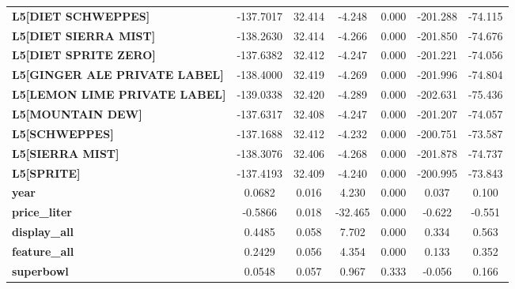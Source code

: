 \begin{center}
\begin{tabular}{lcccccc}
\textbf{L5[DIET SCHWEPPES]}                &    -137.7017  &       32.414     &    -4.248  &         0.000        &     -201.288    &      -74.115     \\
\textbf{L5[DIET SIERRA MIST]}              &    -138.2630  &       32.414     &    -4.266  &         0.000        &     -201.850    &      -74.676     \\
\textbf{L5[DIET SPRITE ZERO]}              &    -137.6382  &       32.412     &    -4.247  &         0.000        &     -201.221    &      -74.056     \\
\textbf{L5[GINGER ALE PRIVATE LABEL]}      &    -138.4000  &       32.419     &    -4.269  &         0.000        &     -201.996    &      -74.804     \\
\textbf{L5[LEMON LIME PRIVATE LABEL]}      &    -139.0338  &       32.420     &    -4.289  &         0.000        &     -202.631    &      -75.436     \\
\textbf{L5[MOUNTAIN DEW]}                  &    -137.6317  &       32.408     &    -4.247  &         0.000        &     -201.207    &      -74.057     \\
\textbf{L5[SCHWEPPES]}                     &    -137.1688  &       32.412     &    -4.232  &         0.000        &     -200.751    &      -73.587     \\
\textbf{L5[SIERRA MIST]}                   &    -138.3076  &       32.406     &    -4.268  &         0.000        &     -201.878    &      -74.737     \\
\textbf{L5[SPRITE]}                        &    -137.4193  &       32.409     &    -4.240  &         0.000        &     -200.995    &      -73.843     \\
\textbf{year}                              &       0.0682  &        0.016     &     4.230  &         0.000        &        0.037    &        0.100     \\
\textbf{price\_liter}                      &      -0.5866  &        0.018     &   -32.465  &         0.000        &       -0.622    &       -0.551     \\
\textbf{display\_all}                      &       0.4485  &        0.058     &     7.702  &         0.000        &        0.334    &        0.563     \\
\textbf{feature\_all}                      &       0.2429  &        0.056     &     4.354  &         0.000        &        0.133    &        0.352     \\
\textbf{superbowl}                         &       0.0548  &        0.057     &     0.967  &         0.333        &       -0.056    &        0.166     \\

\end{tabular}
\end{center}
